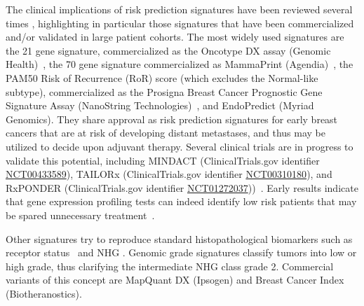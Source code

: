 \documentclass[11pt]{book}
\begin{document}
The clinical implications of risk prediction signatures have been reviewed several times \cite{SotiriouPusztai:2009, Prat:2012, Matikas:2019}, highlighting in particular those signatures that have been commercialized and/or validated in large patient cohorts. The most widely used signatures are the 21 gene signature, commercialized as the Oncotype DX assay (Genomic Health)~\cite{Fisher:1997, Paik:2004, SparanoPaik:2008}, the 70 gene signature commercialized as MammaPrint (Agendia)~\cite{vantVeer:2002}, the PAM50 Risk of Recurrence (RoR) score (which excludes the Normal-like subtype), commercialized as the Prosigna Breast Cancer Prognostic Gene Signature Assay (NanoString Technologies)~\cite{Parker:2009, Wallden:2015}, and EndoPredict (Myriad Genomics). They share approval as risk prediction signatures for early breast cancers that are at risk of developing distant metastases, and thus may be utilized to decide upon adjuvant therapy. Several clinical trials are in progress to validate this potential, including MINDACT (ClinicalTrials.gov identifier \href{https://clinicaltrials.gov/ct2/show/NCT00433589}{NCT00433589}), \mbox{TAILORx} (ClinicalTrials.gov identifier  \href{https://clinicaltrials.gov/ct2/show/NCT00310180}{NCT00310180}), and RxPONDER (ClinicalTrials.gov identifier  \href{https://clinicaltrials.gov/ct2/show/NCT01272037}{NCT01272037}))~\cite{Sparano:2006, Cardoso:2007, Wong:2012}. Early results indicate that gene expression profiling tests can indeed identify low risk patients that may be spared unnecessary treatment~\cite{Cardoso:2016, Stemmer:2017, Sparano:2018}.

Other signatures try to reproduce standard histopathological biomarkers such as receptor status~\cite{Kun:2003, Gruvberger-Saal:2004, Roepman:2009, Bastani:2013, Wilson:2014, Viale:2014, Varga:2017} and NHG \cite{Ivshina:2006, Sotiriou:2006-GG, Ma:2008}. Genomic grade signatures classify tumors into low or high grade, thus clarifying the intermediate NHG class grade 2. Commercial variants of this concept are MapQuant DX (Ipsogen) and Breast Cancer Index (Biotheranostics).
\end{document}
